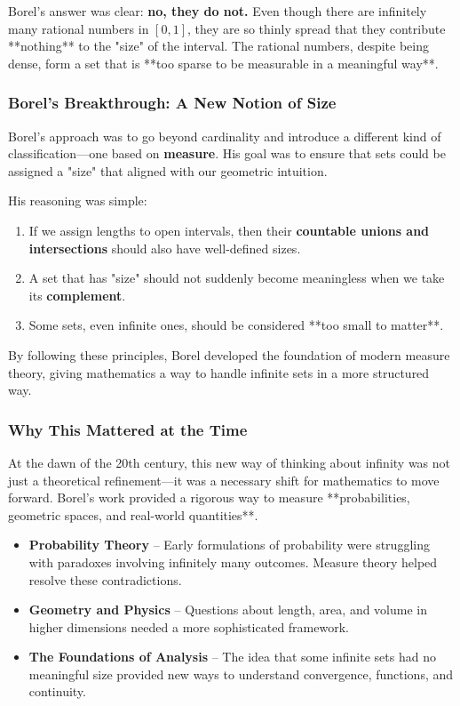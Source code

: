Borel’s answer was clear: \textbf{no, they do not.} Even though there are infinitely many rational numbers in \( [0,1] \), they are so thinly spread that they contribute **nothing** to the "size" of the interval. The rational numbers, despite being dense, form a set that is **too sparse to be measurable in a meaningful way**.

\subsubsection{Borel’s Breakthrough: A New Notion of Size}

Borel’s approach was to go beyond cardinality and introduce a different kind of classification—one based on \textbf{measure}. His goal was to ensure that sets could be assigned a "size" that aligned with our geometric intuition.

His reasoning was simple:
\begin{enumerate}
    \item If we assign lengths to open intervals, then their \textbf{countable unions and intersections} should also have well-defined sizes.
    \item A set that has "size" should not suddenly become meaningless when we take its \textbf{complement}.
    \item Some sets, even infinite ones, should be considered **too small to matter**.
\end{enumerate}

By following these principles, Borel developed the foundation of modern measure theory, giving mathematics a way to handle infinite sets in a more structured way.

\subsubsection{Why This Mattered at the Time}

At the dawn of the 20th century, this new way of thinking about infinity was not just a theoretical refinement—it was a necessary shift for mathematics to move forward. Borel’s work provided a rigorous way to measure **probabilities, geometric spaces, and real-world quantities**.

\begin{itemize}
    \item \textbf{Probability Theory} – Early formulations of probability were struggling with paradoxes involving infinitely many outcomes. Measure theory helped resolve these contradictions.
    \item \textbf{Geometry and Physics} – Questions about length, area, and volume in higher dimensions needed a more sophisticated framework.
    \item \textbf{The Foundations of Analysis} – The idea that some infinite sets had no meaningful size provided new ways to understand convergence, functions, and continuity.
\end{itemize}

